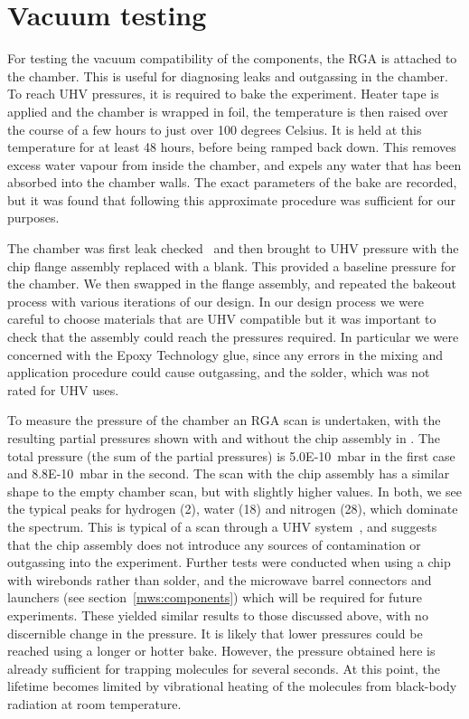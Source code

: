 \section{Vacuum testing}
\label{exper:vacuum}

For testing the vacuum compatibility of the components, the RGA is attached to
the chamber. This is useful for diagnosing leaks and outgassing in the chamber.
To reach UHV pressures, it is required to bake the experiment.  Heater tape is
applied and the chamber is wrapped in foil, the temperature is then raised over
the course of a few hours to just over 100 degrees Celsius.  It is held at this
temperature for at least 48 hours, before being ramped back down. This removes
excess water vapour from inside the chamber, and expels any water that has been
absorbed into the chamber walls. The exact parameters of the bake are recorded,
but it was found that following this approximate procedure was sufficient for
our purposes.

The chamber was first leak checked~\cite{PfeifferVacuum} and then brought to
UHV pressure with the chip flange assembly replaced with a blank. This provided
a baseline pressure for the chamber. We then swapped in the flange assembly,
and repeated the bakeout process with various iterations of our design. In our
design process we were careful to choose materials that are UHV compatible but
it was important to check that the assembly could reach the pressures required.
In particular we were concerned with the Epoxy Technology glue, since any
errors in the mixing and application procedure could cause outgassing, and the
solder, which was not rated for UHV uses.

To measure the pressure of the chamber an RGA scan is undertaken, with the
resulting partial pressures shown with and without the chip assembly in
. The total pressure (the sum of the partial pressures)
is \SI{5.0E-10}{\milli\bar} in the first case and \SI{8.8E-10}{\milli\bar} in
the second.
%
The scan with the chip assembly has a similar shape to the empty chamber scan,
but with slightly higher values.  In both, we see the typical peaks for
hydrogen (2), water (18) and nitrogen (28), which dominate the spectrum. This
is typical of a scan through a UHV system~\cite{PfeifferVacuum}, and suggests
that the chip assembly does not introduce any sources of contamination or
outgassing into the experiment.
%
Further tests were conducted when using a chip with wirebonds rather than
solder, and the microwave barrel connectors and launchers (see
section~\ref{mws:components}) which will be required for future experiments.
These yielded similar results to those discussed above, with no discernible
change in the pressure. It is likely that lower pressures could be reached
using a longer or hotter bake. However, the pressure obtained here is already
sufficient for trapping molecules for several seconds. At this point, the
lifetime becomes limited by vibrational heating of the molecules from
black-body radiation at room temperature.

